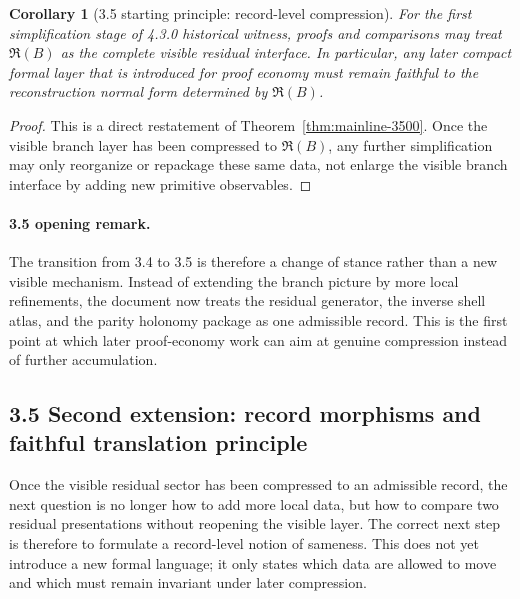 \documentclass[12pt,a4paper]{article}
\newtheorem{corollary}[theorem]{Corollary}
\newcommand{\docversion}{4.3.0 historical witness}
\begin{document}
\begin{corollary}[3.5 starting principle: record-level compression]
\label{cor:mainline-3500}
For the first simplification stage of \docversion, proofs and comparisons may treat $\mathfrak R(B)$ as the complete visible residual interface. In particular, any later compact formal layer that is introduced for proof economy must remain faithful to the reconstruction normal form determined by $\mathfrak R(B)$.
\end{corollary}

\begin{proof}
This is a direct restatement of Theorem~\ref{thm:mainline-3500}. Once the visible branch layer has been compressed to $\mathfrak R(B)$, any further simplification may only reorganize or repackage these same data, not enlarge the visible branch interface by adding new primitive observables.
\end{proof}

\paragraph{3.5 opening remark.}
The transition from 3.4 to 3.5 is therefore a change of stance rather than a new visible mechanism. Instead of extending the branch picture by more local refinements, the document now treats the residual generator, the inverse shell atlas, and the parity holonomy package as one admissible record. This is the first point at which later proof-economy work can aim at genuine compression instead of further accumulation.

\subsection*{3.5 Second extension: record morphisms and faithful translation principle}
Once the visible residual sector has been compressed to an admissible record, the next question is no longer how to add more local data, but how to compare two residual presentations without reopening the visible layer. The correct next step is therefore to formulate a record-level notion of sameness. This does not yet introduce a new formal language; it only states which data are allowed to move and which must remain invariant under later compression.
\end{document}
